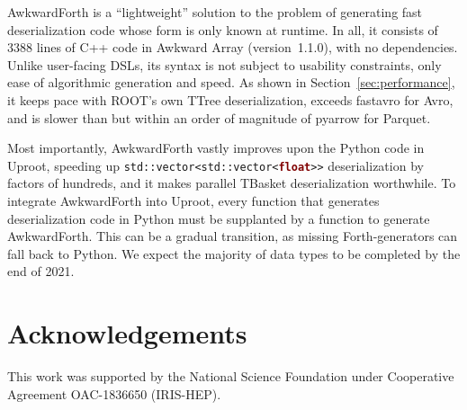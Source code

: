 \documentclass{webofc}
\begin{document}
AwkwardForth is a ``lightweight'' solution to the problem of generating fast deserialization code whose form is only known at runtime. In all, it consists of 3388 lines of C++ code in Awkward Array (version~1.1.0), with no dependencies. Unlike user-facing DSLs, its syntax is not subject to usability constraints, only ease of algorithmic generation and speed. As shown in Section~\ref{sec:performance}, it keeps pace with ROOT's own TTree deserialization, exceeds fastavro for Avro, and is slower than but within an order of magnitude of pyarrow for Parquet.

Most importantly, AwkwardForth vastly improves upon the Python code in Uproot, speeding up {\tt std::vector<std::vector<\textcolor{Maroon}{\textbf{float}}>{}>} deserialization by factors of hundreds, and it makes parallel TBasket deserialization worthwhile. To integrate AwkwardForth into Uproot, every function that generates deserialization code in Python must be supplanted by a function to generate AwkwardForth. This can be a gradual transition, as missing Forth-generators can fall back to Python. We expect the majority of data types to be completed by the end of 2021.

\section{Acknowledgements}

This work was supported by the National Science Foundation under Cooperative Agreement OAC-1836650 (IRIS-HEP).






\end{document}

